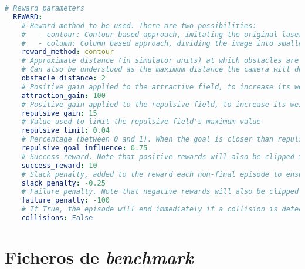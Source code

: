 \begin{lstlisting}[language=yaml]
  # Reward parameters
  REWARD:
    # Reward method to be used. There are two possibilities:
    #	- contour: Contour based approach, imitating the original laser-based proposal
    #	- column: Column based approach, dividing the image into smaller columns and computing each column as obstacle / no obstacle.
    reward_method: contour
    # Approximate distance (in simulator units) at which obstacles are when they are at the threshold.
    # Can also be understood as the maximum distance the camera will detect obstacles
    obstacle_distance: 2
    # Positive gain applied to the attractive field, to increase its weight
    attraction_gain: 100
    # Positive gain applied to the repulsive field, to increase its weight
    repulsive_gain: 15
    # Value used to limit the repulsive field's maximum value
    repulsive_limit: 0.04
    # Percentage (between 0 and 1). When the goal is closer than repulsive_goal_influence * obstacle_distance, the effect of the repulsive field gets decreased
    repulsive_goal_influence: 0.75
    # Success reward. Note that positive rewards will also be clipped to this value
    success_reward: 10
    # Slack penalty, added to the reward each non-final episode to ensure that the agent doesn't end in a loop of doing actions without reward to avoid a penalty
    slack_penalty: -0.25
    # Failure penalty. Note that negative rewards will also be clipped to this value
    failure_penalty: -100
    # If True, the episode will end immediately if a collision is detected
    collisions: False
\end{lstlisting}

\section{Ficheros de \textit{benchmark}}


